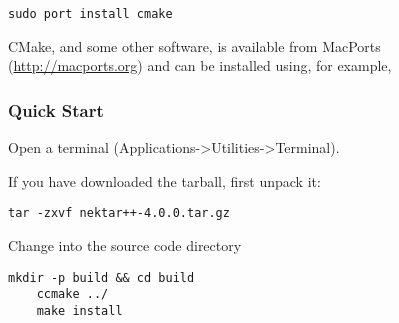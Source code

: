 \newsavebox\installationOSXMacPortsTip
\begin{lrbox}{\installationOSXMacPortsTip}\begin{minipage}{0.8\linewidth}
\begin{lstlisting}[style=BashInputStyle]
sudo port install cmake
\end{lstlisting}
\end{minipage}
\end{lrbox}

\begin{tipbox}
CMake, and some other software, is available from MacPorts
(\url{http://macports.org}) and can be installed using, for example,

\noindent\usebox\installationOSXMacPortsTip
\end{tipbox}


\subsubsection{Quick Start}
Open a terminal (Applications->Utilities->Terminal).

If you have downloaded the tarball, first unpack it:
\begin{lstlisting}[style=BashInputStyle]
    tar -zxvf nektar++-4.0.0.tar.gz
\end{lstlisting}
Change into the  source code directory
\begin{lstlisting}[style=BashInputStyle]
    mkdir -p build && cd build 
    ccmake ../
    make install
\end{lstlisting}

